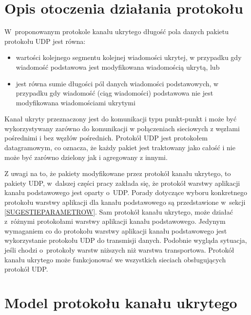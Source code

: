 \documentclass[a4paper, twoside, 12pt]{report}
\begin{document}
    \section{Opis otoczenia działania protokołu}
    W~proponowanym protokole kanału ukrytego długość pola danych pakietu protokołu UDP
    jest równa:
    \begin{itemize}
        \item wartości kolejnego segmentu kolejnej wiadomości ukrytej, w przypadku
            gdy wiadomość podstawowa jest modyfikowana wiadomością ukrytą, lub
        \item jest równa sumie długości pól danych wiadomości podstawowych, w przypadku
            gdy wiadomość (ciąg wiadomości) podstawowa nie jest modyfikowana wiadomościami
            ukrytymi
    \end{itemize}
    Kanał ukryty przeznaczony jest do komunikacji typu punkt-punkt i może być
    wykorzystywany zarówno do komunikacji w połączeniach sieciowych z węzłami
    pośrednimi i bez węzłów pośrednich. Protokół UDP jest protokołem datagramowym, co
    oznacza, że każdy pakiet jest traktowany jako całość i nie może
    być zarówno dzielony jak i agregowany z innymi.

    Z uwagi na to, że pakiety modyfikowane przez protokół kanału ukrytego, to pakiety UDP,
    w~dalszej części pracy zakłada się, że protokół warstwy aplikacji kanału podstawowego jest oparty o~UDP.
    Porady dotyczące wyboru konkretnego protokołu warstwy aplikacji dla
    kanału podstawowego są przedstawione w~sekcji \ref{SUGESTIEPARAMETROW}. Sam protokół kanału
    ukrytego, może działać z~różnymi protokołami warstwy aplikacji kanału podstawowego.
    Jedynym wymaganiem co do protokołu warstwy aplikacji kanału podstawowego
    jest wykorzystanie protokołu UDP do transmisji danych. Podobnie wygląda sytuacja,
    jeśli chodzi o~protokoły warstw niższych niż warstwa transportowa. Protokół kanału
    ukrytego może funkcjonować we wszystkich sieciach obsługujących protokół UDP.

    \section{Model protokołu kanału ukrytego}
\end{document}
